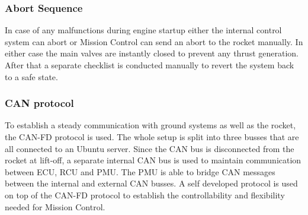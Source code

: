 \subsubsection{Abort Sequence}

In case of any malfunctions during engine startup either the internal control system can abort or Mission Control can send an abort to the rocket manually. In either case the main valves are instantly closed to prevent any thrust generation. After that a separate checklist is conducted manually to revert the system back to a safe state.

\subsubsection{CAN protocol}

To establish a steady communication with ground systems as well as the rocket, the CAN-FD protocol is used. The whole setup is split into three busses that are all connected to an Ubuntu server. Since the CAN bus is disconnected from the rocket at lift-off, a separate internal CAN bus is used to maintain communication between ECU, RCU and PMU. The PMU is able to bridge CAN messages between the internal and external CAN busses. A self developed protocol is used on top of the CAN-FD protocol to establish the controllability and flexibility needed for Mission Control.




